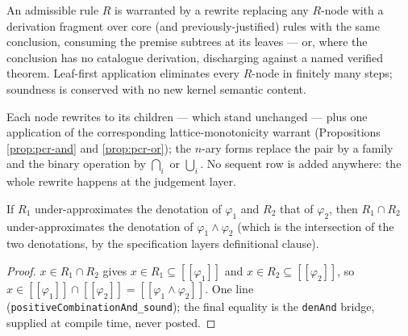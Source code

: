 

\begin{brecipe}\label{rec:pcr-template}
An admissible rule $R$ is warranted by a rewrite replacing any
$R$-node with a derivation fragment over core (and
previously-justified) rules with the same conclusion, consuming the
premise subtrees at its leaves --- or, where the conclusion has no
catalogue derivation, discharging against a named verified theorem.
Leaf-first application eliminates every $R$-node in finitely many
steps; soundness is conserved with no new kernel semantic content.
\end{brecipe}

\begin{brecipe}\label{rec:pcr-instance}
Each node rewrites to its children --- which stand unchanged --- plus
one application of the corresponding lattice-monotonicity warrant
(Propositions \ref{prop:pcr-and} and \ref{prop:pcr-or}); the $n$-ary
forms replace the pair by a family and the binary operation by
$\bigcap_i$ or $\bigcup_i$. No sequent row is added anywhere: the
whole rewrite happens at the judgement layer.
\end{brecipe}

\begin{bprop}\label{prop:pcr-and}
If $R_1$ under-approximates the denotation of $\varphi_1$ and $R_2$
that of $\varphi_2$, then $R_1 \cap R_2$ under-approximates the
denotation of $\varphi_1 \wedge \varphi_2$ (which is the intersection
of the two denotations, by the specification layer\textquotesingle s
definitional clause).
\end{bprop}
\begin{proof}
$x \in R_1 \cap R_2$ gives $x \in R_1 \subseteq
[\![\varphi_1]\!]$ and $x \in R_2 \subseteq [\![\varphi_2]\!]$, so
$x \in [\![\varphi_1]\!] \cap [\![\varphi_2]\!] =
[\![\varphi_1 \wedge \varphi_2]\!]$. One line
(\texttt{positiveCombinationAnd\_sound}); the final equality is the
\texttt{denAnd} bridge, supplied at compile time, never posted.
\end{proof}

